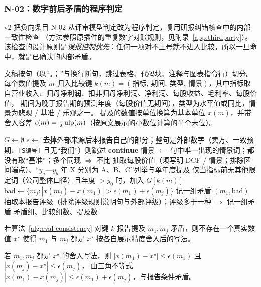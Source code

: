 \subsubsection{N-02：数字前后矛盾的程序判定}

v2 把负向条目 N-02 从评审模型判定改为程序判定，复用研报纠错核查中的内部一致性检查
（方法参照原插件的重复数字对账规则，见附录~\ref{app:thirdparty}）。
该检查的设计原则是\emph{误报控制优先}：任何一项对不上号就不进入比较，所以一旦命中，就是已确认的内部矛盾。

\begin{definition}[比较键与提及]
\label{def:eval-key}
文稿按句（以“。；”与换行断句，跳过表格、代码块、注释与图表指令行）切分。每个数值提及 $m$ 归入比较键
$k(m)=(\text{指标},\ \text{期间},\ \text{类型},\ \text{情景})$，其中指标取自{营业收入、归母净利润、扣非归母净利润、净利润、每股收益、毛利率、每股价值}，
期间为晚于报告期的预测年度（每股价值无期间），类型为水平值或同比，情景为悲观 / 基准 / 乐观之一。
提及的数值按单位换算为基本单位 $x(m)$，并带舍入容差 $\epsilon(m)=\tfrac12\operatorname{ulp}(m)$（按原文展示的小数位计算的半个末位）。
\end{definition}

\begin{algorithm}[t]
\caption{内部一致性检查（N-02，）}
\label{alg:eval-consistency}
\begin{algorithmic}[1]
  \State $G\gets\emptyset$ 
    \State $s\gets$ 去掉外部来源后本报告自己的部分；整句是外部数字（卖方、一致预期、\texttt{[S编号]} 且无“我们”）则跳过
     \State \textbf{continue} \EndIf
    \State 情景 $\gets$ 句中唯一出现的情景词；都没有取“基准”；多个同现 $\Rightarrow$ 不比
    \State 抽取每股价值（须写明 DCF / 情景；排除区间端点）、“$y_a$—$y_b$ 年 X 分别为 A、B、C”列举与单年度提及
    \State 仅当指标前无其他限定词（公司整体口径）且年度 $>y_0$ 时，加入 $G[k(m)]$
  \EndFor
    \State $\mathrm{bad}\gets\{m_j: |x(m_j)-x(m_1)|>\epsilon(m_1)+\epsilon(m_j)\}$
     \State 记一组矛盾 $(m_1,\mathrm{bad})$ \EndIf
  \EndFor
  \State 抽取本报告评级（排除评级规则说明句与外部评级）；评级多于一种 $\Rightarrow$ 记一组矛盾
  \State \Return 矛盾组、比较组数、提及数
\EndFunction
\end{algorithmic}
\end{algorithm}

\begin{proposition}[命中即矛盾]
\label{prop:eval-nofp}
若算法~\ref{alg:eval-consistency} 对键 $k$ 报告提及 $m_1,m_j$ 矛盾，则不存在一个真实数值 $x^\star$ 使得 $m_1$ 与 $m_j$
都是 $x^\star$ 按各自展示精度舍入后的写法。
\end{proposition}
\begin{evproof}
若 $m_1,m_j$ 都是 $x^\star$ 的舍入写法，则 $|x(m_1)-x^\star|\le\epsilon(m_1)$ 且 $|x(m_j)-x^\star|\le\epsilon(m_j)$，
由三角不等式 $|x(m_1)-x(m_j)|\le\epsilon(m_1)+\epsilon(m_j)$，与报告条件矛盾。
\end{evproof}


